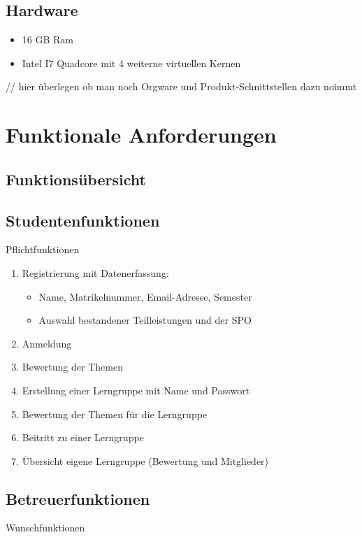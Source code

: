 \documentclass[parskip=full]{scrartcl}
\newcommand{\swtLabel}[1]{\textbf{\textbackslash #1\arabic*0\textbackslash}}
\begin{document}
\subsection{Hardware}
\begin{itemize} 
  \item 16 GB Ram
  \item Intel I7 Quadcore mit 4 weiterne virtuellen Kernen 
\end{itemize}
// hier überlegen ob man noch Orgware und Produkt-Schnittstellen dazu noimmt
\section{Funktionale Anforderungen}

\subsection{Funktionsübersicht}

\subsection{Studentenfunktionen}

Pflichtfunktionen

\begin{enumerate}[label=\swtLabel{FA}]
  \item Registrierung mit Datenerfassung:
  \begin{itemize}
    \item Name, Matrikelnummer, Email-Adresse, Semester
    \item Auswahl bestandener Teilleistungen und der SPO
  \end{itemize}
  \item Anmeldung
  \item Bewertung der Themen
  \item Erstellung einer Lerngruppe mit Name und Passwort
  \item Bewertung der Themen für die Lerngruppe
  \item Beitritt zu einer Lerngruppe
  \item Übersicht eigene Lerngruppe (Bewertung und Mitglieder)
\end{enumerate}

\subsection{Betreuerfunktionen}

Wunschfunktionen
\end{document}
